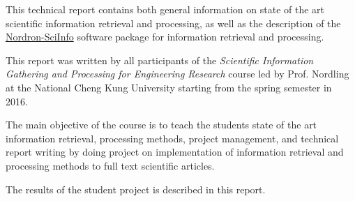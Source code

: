 	This technical report contains both general information on state of the art scientific information retrieval and processing, as well as the description of the \href{https://bitbucket.org/nordron/nordron-sciinfo}{Nordron-SciInfo} software package for information retrieval and processing. 
	
	This report was written by all participants of the \emph{Scientific Information Gathering and Processing for Engineering Research} course led by Prof. Nordling at the National Cheng Kung University starting from the spring semester in 2016.
	
	The main objective of the course is to teach the students state of the art information retrieval, processing methods, project management, and technical report writing by doing project on implementation of information retrieval and processing methods to full text scientific articles.
	
	The results of the student project is described in this report.